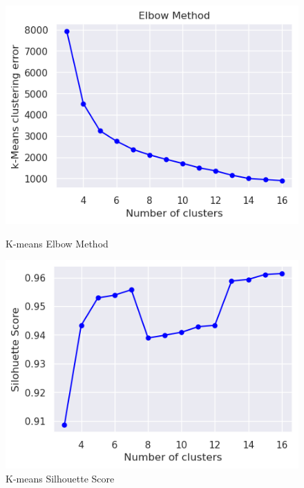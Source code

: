         \begin{figure}[h]
            \centering
            \begin{minipage}[c]{0.47\textwidth}
                \centering
                \includegraphics[width=\textwidth]{../figures/plots/section3/k-means_clustering_error.png}
                \caption{K-means Elbow Method}
                \label{fig:tsne_kmeans}
            \end{minipage}
            \hfill
            \begin{minipage}[c]{0.47\textwidth}
                \centering
                \includegraphics[width=\textwidth]{../figures/plots/section3/k-means_silohuette_score.png}
                \caption{K-means Silhouette Score}
                \label{fig:tsne_gmm}
            \end{minipage}
        \end{figure}
        
